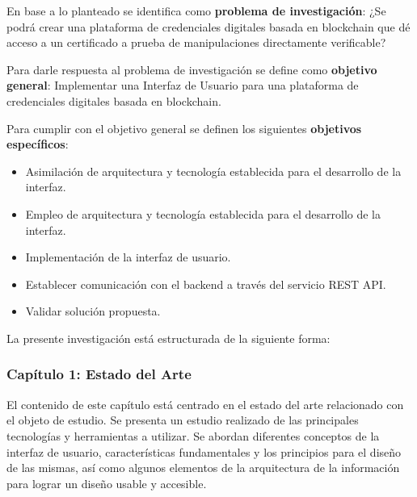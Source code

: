 En base a lo planteado se identifica como \textbf{problema de investigaci\'on}: ¿Se podr\'a crear una plataforma de credenciales digitales basada en blockchain que d\'e acceso a un certificado a prueba de manipulaciones directamente verificable?\par

Para darle respuesta al problema de investigaci\'on se define como \textbf{objetivo general}: Implementar una Interfaz de Usuario para una plataforma de credenciales digitales basada en blockchain.

Para cumplir con el objetivo general se definen los siguientes \textbf{objetivos espec\'ificos}:
\begin{itemize}
\item Asimilaci\'on de arquitectura y tecnolog\'ia establecida para el desarrollo de la interfaz.
\item Empleo de arquitectura y tecnolog\'ia establecida para el desarrollo de la interfaz.
\item Implementaci\'on de la interfaz de usuario.
\item Establecer comunicaci\'on con el backend  a trav\'es del servicio REST API.
\item Validar soluci\'on propuesta.
\end{itemize}

La presente investigación está estructurada de la siguiente forma:

\subsubsection*{Capítulo 1: Estado del Arte}

El contenido de este capítulo está centrado en el estado del arte relacionado con el objeto de estudio. Se presenta un estudio realizado de las principales tecnologías y herramientas a utilizar. Se abordan diferentes conceptos de la interfaz de usuario, características fundamentales y los principios para el diseño de las mismas, así como algunos elementos de la arquitectura de la información para lograr un diseño usable y accesible.


